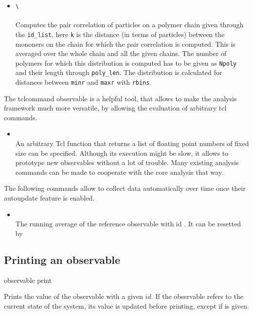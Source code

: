 \begin{itemize}
{		<cut\_off>} \\
		Calculates the persistence length of the given polymer specified through the
		\verb!id_list!. \verb!max_d! is the maximum distance (in terms of particles) for
		which the correlation is computed. With \verb!cut_off! the number of
		particles at the polymer ends that are ignored for the calculation, can be
		specified. 
	\item {} \verb!\!\\
		 \\
		Computes the pair correlation of particles on a polymer chain given through
		the \verb!id_list!, here \verb!k! is the distance (in terms of particles) between
		the mononers on the chain for which the pair correlation is computed. This
		is averaged over the whole chain and all the given chains. The number of
		polymers for which this distribution is computed has to be given as
		\verb!Npoly! and their length through \verb!poly_len!. The distribution is
		calculated for distances between \verb!minr! and \verb!maxr! with
		\verb!rbins!. 
      \end{itemize}
The tclcommand observable is a helpful tool, that allows to make the 
analysis framework much more versatile, by allowing
the evaluation of arbitrary tcl commands.
  \begin{itemize}
    \item {} \\
        An arbitrary Tcl function that returns a list of floating point numbers of fixed size
         can be specified. Although its execution might be slow, it allows 
        to prototype new observables without a lot of trouble.
        Many existing analysis commands can be made to cooperate with the core analysis that way.
  \end{itemize}
The following commands allow to collect data automatically over time
once their autoupdate feature is enabled.

  \begin{itemize}
    \item {} \\
      The running average of the reference observable with id . 
      It can be resetted by 
  \end{itemize}
\subsection{Printing an observable}
\begin{essyntax}
observable  print  
\end{essyntax}
Prints the value of the observable with a given $id$. If the observable
refers to the current state of the system, its value is updated before printing, except
if  is given.

